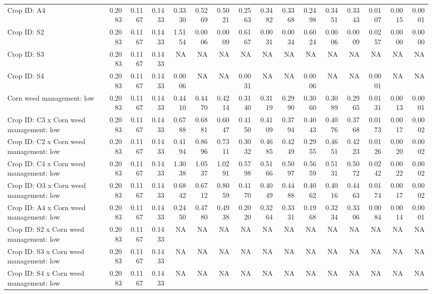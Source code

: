 \documentclass[utf8]{frontiersSCNS}
\begin{document}
\begin{landscape}
\begin{table}
{\begin{tabular}[t]{lrr>{}rrr>{}rrr>{}rrr>{}rrr>{}r}
Crop ID: A4 & 0.2083 & 0.1167 & 0.1433 & 0.3330 & 0.5269 & 0.5021 & 0.2563 & 0.3482 & 0.3368 & 0.2498 & 0.3451 & 0.3343 & 0.0107 & 0.0015 & 0.0001\\
Crop ID: S2 & 0.2083 & 0.1167 & 0.1433 & 1.5154 & 0.0006 & 0.0009 & 0.6167 & 0.0031 & 0.0034 & 0.6024 & 0.0006 & 0.0009 & 0.0257 & 0.0000 & 0.0000\\
Crop ID: S3 & 0.2083 & 0.1167 & 0.1433 & NA & NA & NA & NA & NA & NA & NA & NA & NA & NA & NA & NA\\
Crop ID: S4 & 0.2083 & 0.1167 & 0.1433 & 0.0006 & NA & NA & 0.0031 & NA & NA & 0.0006 & NA & NA & 0.0001 & NA & NA\\
Corn weed management: low & 0.2083 & 0.1167 & 0.1433 & 0.4410 & 0.4470 & 0.4214 & 0.3140 & 0.3119 & 0.2990 & 0.3060 & 0.3089 & 0.2965 & 0.0131 & 0.0013 & 0.0001\\
Crop ID: C3 x Corn weed management: low & 0.2083 & 0.1167 & 0.1433 & 0.6788 & 0.6881 & 0.6047 & 0.4150 & 0.4109 & 0.3794 & 0.4043 & 0.4076 & 0.3768 & 0.0173 & 0.0017 & 0.0002\\
Crop ID: C2 x Corn weed management: low & 0.2083 & 0.1167 & 0.1433 & 0.4194 & 0.8696 & 0.7311 & 0.3032 & 0.4685 & 0.4249 & 0.2955 & 0.4651 & 0.4223 & 0.0126 & 0.0020 & 0.0002\\
Crop ID: C4 x Corn weed management: low & 0.2083 & 0.1167 & 0.1433 & 1.3038 & 1.0537 & 1.0291 & 0.5798 & 0.5166 & 0.5097 & 0.5659 & 0.5131 & 0.5072 & 0.0242 & 0.0022 & 0.0002\\
Crop ID: O3 x Corn weed management: low & 0.2083 & 0.1167 & 0.1433 & 0.6842 & 0.6712 & 0.8059 & 0.4170 & 0.4049 & 0.4488 & 0.4062 & 0.4016 & 0.4463 & 0.0174 & 0.0017 & 0.0002\\
Crop ID: A4 x Corn weed management: low & 0.2083 & 0.1167 & 0.1433 & 0.2450 & 0.4780 & 0.4938 & 0.2020 & 0.3264 & 0.3331 & 0.1968 & 0.3234 & 0.3306 & 0.0084 & 0.0014 & 0.0001\\
Crop ID: S2 x Corn weed management: low & 0.2083 & 0.1167 & 0.1433 & NA & NA & NA & NA & NA & NA & NA & NA & NA & NA & NA & NA\\
Crop ID: S3 x Corn weed management: low & 0.2083 & 0.1167 & 0.1433 & NA & NA & NA & NA & NA & NA & NA & NA & NA & NA & NA & NA\\
Crop ID: S4 x Corn weed management: low & 0.2083 & 0.1167 & 0.1433 & NA & NA & NA & NA & NA & NA & NA & NA & NA & NA & NA & NA\\
\bottomrule
\end{tabular}}
\end{table}
\end{landscape}
\end{document}
